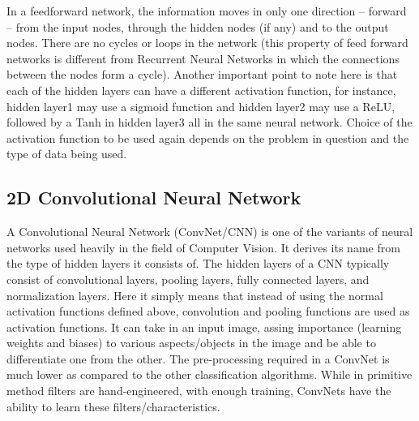 \documentclass{report}
\begin{document}
In a feedforward network, the information moves in only one direction – forward – from the input nodes, through the hidden nodes (if any)
and to the output nodes. There are no cycles or loops in the network (this property of feed forward networks is different from Recurrent
Neural Networks in which the connections between the nodes form a cycle). Another important point to note here is that each of the hidden
layers can have a different activation function, for instance, hidden layer1 may use a sigmoid function and hidden layer2 may use a ReLU,
followed by a Tanh in hidden layer3 all in the same neural network. Choice of the activation function to be used again depends on the
problem in question and the type of data being used.

\subsection {2D Convolutional Neural Network}
A Convolutional Neural Network (ConvNet/CNN) is one of the variants of neural networks used heavily in the field of Computer Vision. It
derives its name from the type of hidden layers it consists of. The hidden layers of a CNN typically consist of convolutional layers, pooling
layers, fully connected layers, and normalization layers. Here it simply means that instead of using the normal activation functions defined
above, convolution and pooling functions are used as activation functions.
It can take in an input image, assing importance (learning weights and biases) to various aspects/objects in the image and be able to
differentiate one from the other. The pre-processing required in a ConvNet is much lower as compared to the other classification algorithms.
While in primitive method filters are hand-engineered, with enough training, ConvNets have the ability to learn these filters/characteristics.
\end{document}
